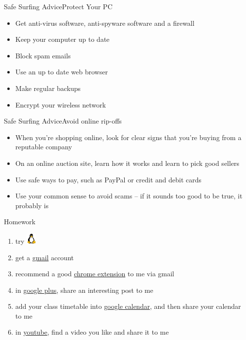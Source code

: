 \begin{frame}{Safe Surfing Advice}{Protect Your PC}
  \begin{itemize}
  \item Get anti-virus software, anti-spyware software and a firewall
  \item Keep your computer up to date
  \item Block spam emails
  \item Use an up to date web browser
  \item Make regular backups
  \item Encrypt your wireless network
  \end{itemize}
\end{frame}

\begin{frame}{Safe Surfing Advice}{Avoid online rip-offs}
  \begin{itemize}
  \item When you're shopping online, look for clear signs that you're buying from a reputable
    company
  \item On an online auction site, learn how it works and learn to pick good sellers
  \item Use safe ways to pay, such as PayPal or credit and debit cards
  \item Use your common sense to avoid scams – if it sounds too good to be true, it probably is
  \end{itemize}
\end{frame}

\begin{frame}{Homework}
  \begin{enumerate}
  \item try \includegraphics[height=1.5em]{linuxlogo}
  \item get a \href{https://mail.google.com}{gmail} account
  \item recommend a good
    \href{https://chrome.google.com/webstore/category/apps?utm_source=chrome-ntp-icon}{chrome
    extension} to me via gmail
  \item in \href{https://plus.google.com}{google plus}, share an interesting post to me
  \item add your class timetable into \href{https://calendar.google.com}{google calendar},
    and then share your calendar to me
  \item in \href{https://youtube.com}{youtube}, find a video you like and share it to me
  \end{enumerate}
\end{frame}


